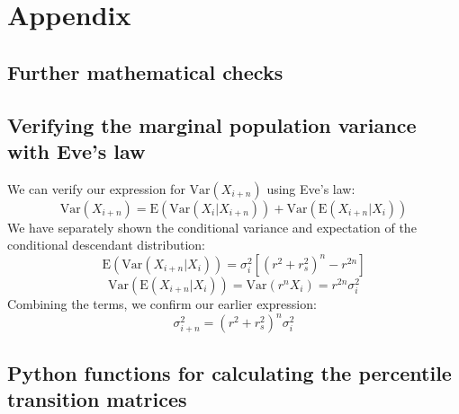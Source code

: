 \documentclass[a4paper,11pt]{article} %
\begin{document}
\clearpage







\clearpage



\section{Appendix}

\subsection{Further mathematical checks}
\subsection*{Verifying the marginal population variance with Eve's law}
We can verify our expression for $\mathrm{Var}(X_{i+n})$ using Eve's law:
%
$$\mathrm{Var}(X_{i+n}) = \mathrm{E}(\mathrm{Var}(X_i|X_{i+n})) + \mathrm{Var}(\mathrm{E}(X_{i+n}|X_i))$$
%
We have separately shown the conditional variance and expectation of the conditional descendant distribution:
%
$$\mathrm{E}(\mathrm{Var}(X_{i+n}|X_i)) = \sigma_i^2 [(r^2+r_s^2)^n-r^{2n}]$$
$$\mathrm{Var}(\mathrm{E}(X_{i+n}|X_i)) = \mathrm{Var}(r^nX_i) = r^{2n}\sigma_i^2$$
%
Combining the terms, we confirm our earlier expression:
%
$$\sigma_{i+n}^2 = (r^2+r_s^2)^n  \sigma_i^2$$

\subsection{Python functions for calculating the percentile transition matrices}
\end{document}
